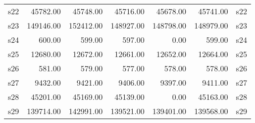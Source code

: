 \begin{table}[ht]
\begin{tabular}{rrrrrrl}
  s22 & 45782.00 & 45748.00 & 45716.00 & 45678.00 & 45741.00 & s22 \\ 
  s23 & 149146.00 & 152412.00 & 148927.00 & 148798.00 & 148979.00 & s23 \\ 
  s24 & 600.00 & 599.00 & 597.00 & 0.00 & 599.00 & s24 \\ 
  s25 & 12680.00 & 12672.00 & 12661.00 & 12652.00 & 12664.00 & s25 \\ 
  s26 & 581.00 & 579.00 & 577.00 & 578.00 & 578.00 & s26 \\ 
  s27 & 9432.00 & 9421.00 & 9406.00 & 9397.00 & 9411.00 & s27 \\ 
  s28 & 45201.00 & 45169.00 & 45139.00 & 0.00 & 45163.00 & s28 \\ 
  s29 & 139714.00 & 142991.00 & 139521.00 & 139401.00 & 139568.00 & s29 \\ 
   \hline
\end{tabular}
\end{table}

